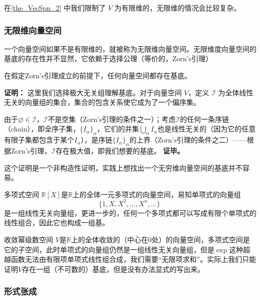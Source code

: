 在\autoref{the_VecSpn_2} 中我们限制了 $V$ 为有限维的，无限维的情况会比较复杂。

\subsubsection{无限维向量空间}

一个向量空间如果不是有限维的，就被称为无限维向量空间。无限维度向量空间的基底的存在性并不显然，它依赖于选择公理（等价的，Zorn's引理）

\begin{theorem}{}
在假定Zorn's引理成立的前提下，任何向量空间都存在基底。
\end{theorem}
\textbf{证明：}
这里我们选择极大无关组理解基底。对于向量空间 $V$，定义 $\mathcal{I}$ 为全体线性无关的向量组的集合，集合的包含关系使它成为了一个偏序集。


由于$\varnothing \in \mathcal{I}$，$\mathcal{I}$不是空集（Zorn's引理的条件之一）；考虑$\mathcal{I}$的任何一条序链（chain），即全序子集，$\{I_\alpha\}_\alpha$，它们的并集$\bigcup_\alpha I_\alpha$也是线性无关的（因为它的任意有限子集都包含于某个$I_\alpha$），是序链$\{I_\alpha\}_\alpha$的上界（Zorn's引理的条件之二）——根据Zorn's引理，$\mathcal{I}$存在极大值，即我们想要的基底。
\textbf{证毕。}

这个证明是一个非构造性证明，实践上想找出一个无穷维向量空间的基底并不容易。

\begin{example}{多项式空间}
$\mathbb{R}[X]$是$\mathbb{R}$上的全体一元多项式的向量空间，易知单项式的向量组
\begin{equation}
\{1, X, X^2, \dots, X^n, \dots\}~
\end{equation}
是一组线性无关向量组，更进一步的，任何一个多项式都可以写成有限个单项式的线性组合，因此它也构成一组基。
\end{example}

\begin{example}{收敛幂级数空间}
$V$是$\mathbb{R}$上的全体收敛的（中心在$0$处）的向量空间，多项式空间是它的子空间，此时单项式的向量组仍然是一组线性无关向量组，但是$\exp$这种超越函数无法由有限项单项式线性组合成，我们需要“无限项求和”。实际上我们只能证明$V$存在一组（不可数的）基底，但是没有办法显式的写出来。
\end{example}



\subsubsection{形式张成}

